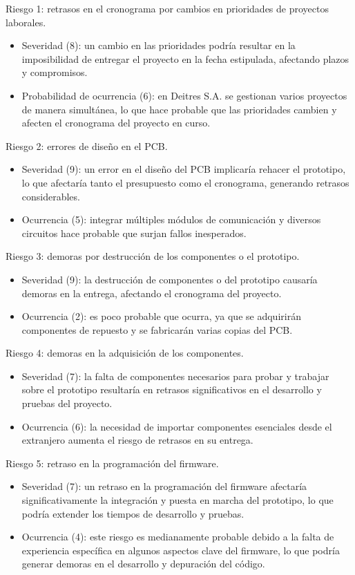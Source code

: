 \documentclass[
11pt, %
]{charter}
\begin{document}
Riesgo 1: retrasos en el cronograma por cambios en prioridades de proyectos laborales.
\begin{itemize}
	\item Severidad (8): un cambio en las prioridades podría resultar en la imposibilidad de entregar el proyecto en la fecha estipulada, afectando plazos y compromisos.
	\item Probabilidad de ocurrencia (6): en Deitres S.A. se gestionan varios proyectos de manera simultánea, lo que hace probable que las prioridades cambien y afecten el cronograma del proyecto en curso.
\end{itemize}   

Riesgo 2: errores de diseño en el PCB.
\begin{itemize}
	\item Severidad (9): un error en el diseño del PCB implicaría rehacer el prototipo, lo que afectaría tanto el presupuesto como el cronograma, generando retrasos considerables.
	\item Ocurrencia (5): integrar múltiples módulos de comunicación y diversos circuitos hace probable que surjan fallos inesperados.
\end{itemize}   


Riesgo 3: demoras por destrucción de los componentes o el prototipo.
\begin{itemize}
	\item Severidad (9):  la destrucción de componentes o del prototipo causaría demoras en la entrega, afectando el cronograma del proyecto.
	\item Ocurrencia (2):  es poco probable que ocurra, ya que se adquirirán componentes de repuesto y se fabricarán varias copias del PCB.
\end{itemize}   

Riesgo 4:  demoras en la adquisición de los componentes.
\begin{itemize}
	\item Severidad (7): la falta de componentes necesarios para probar y trabajar sobre el prototipo resultaría en retrasos significativos en el desarrollo y pruebas del proyecto.
	\item Ocurrencia (6): la necesidad de importar componentes esenciales desde el extranjero aumenta el riesgo de retrasos en su entrega.
\end{itemize}   

Riesgo 5: retraso en la programación del firmware.
\begin{itemize}
	\item Severidad (7): un retraso en la programación del firmware afectaría significativamente la integración y puesta en marcha del prototipo, lo que podría extender los tiempos de desarrollo y pruebas.
	\item Ocurrencia (4):  este riesgo es medianamente probable debido a la falta de experiencia específica en algunos aspectos clave del firmware, lo que podría generar demoras en el desarrollo y depuración del código.
\end{itemize}   
\end{document}
